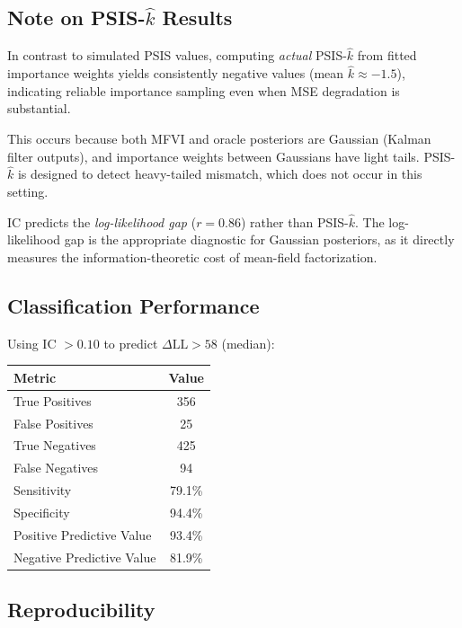 \documentclass[10pt]{article} %
\theoremstyle{plain}
\theoremstyle{definition}
\begin{document}
\subsection{Note on PSIS-$\hat{k}$ Results}

In contrast to simulated PSIS values, computing \emph{actual} PSIS-$\hat{k}$ from fitted importance weights yields consistently negative values (mean $\hat{k} \approx -1.5$), indicating reliable importance sampling even when MSE degradation is substantial.

This occurs because both MFVI and oracle posteriors are Gaussian (Kalman filter outputs), and importance weights between Gaussians have light tails. PSIS-$\hat{k}$ is designed to detect heavy-tailed mismatch, which does not occur in this setting.

\begin{tcolorbox}[colback=blue!5!white, colframe=blue!50!black, title=Methodological Note]
IC predicts the \emph{log-likelihood gap} ($r = 0.86$) rather than PSIS-$\hat{k}$. The log-likelihood gap is the appropriate diagnostic for Gaussian posteriors, as it directly measures the information-theoretic cost of mean-field factorization.
\end{tcolorbox}

\subsection{Classification Performance}

Using IC $> 0.10$ to predict $\Delta\text{LL} > 58$ (median):

\begin{center}
\begin{tabular}{lc}
\toprule
Metric & Value \\
\midrule
True Positives & 356 \\
False Positives & 25 \\
True Negatives & 425 \\
False Negatives & 94 \\
\midrule
Sensitivity & 79.1\% \\
Specificity & 94.4\% \\
Positive Predictive Value & 93.4\% \\
Negative Predictive Value & 81.9\% \\
\bottomrule
\end{tabular}
\end{center}

\subsection{Reproducibility}
\end{document}
